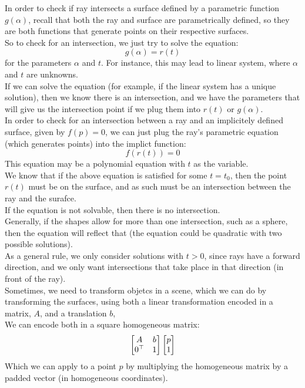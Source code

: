 \documentclass[12pt]{article}
\begin{document}
In order to check if ray intersects a
surface defined by a parametric function
$g(\alpha)$, recall that both the ray and
surface are parametrically defined, so
they are both functions that generate points
on their respective surfaces. \\
So to check for an intersection, we just try to
solve the equation:
\[ g(\alpha) = r(t) \]
for the parameters $\alpha$ and $t$.
For instance, this may lead to linear system,
where $\alpha$ and $t$ are unknowns. \\
If we can solve the equation (for example,
if the linear system has a unique solution),
then we know there is an intersection, and
we have the parameters that will give us the
intersection point if we plug them into
$r(t)$ or $g(\alpha)$. \\

In order to check for an intersection between
a ray and an implicitely defined surface,
given by $f(p) = 0$,
we can just plug the ray's parametric equation
(which generates points) into the implict function:
\[ f(r(t)) = 0 \]
This equation may be a polynomial equation with $t$
as the variable. \\
We know that if the above equation is satisfied
for some $t = t_0$, then the point $r(t)$
must be on the surface, and as such must be
an intersection between the ray and the surafce. \\
If the equation is not solvable, then there
is no intersection. \\
Generally, if the shapes allow for more than one
intersection, such as a sphere, then the equation
will reflect that (the equation could be
quadratic with two possible solutions). \\

As a general rule, we only consider solutions
with $t > 0$, since rays have a forward direction,
and we only want intersections that take place
in that direction (in front of the ray). \\

Sometimes, we need to transform objetcs in a
scene, which we can do by transforming the surfaces,
using both a linear transformation encoded in
a matrix, $A$, and a translation $b$, \\
We can encode both in a square homogeneous matrix:
\[ \begin{bmatrix} A & b \\ 0^\top & 1 \end{bmatrix} \begin{bmatrix} p \\ 1 \end{bmatrix} \]
Which we can apply to a point $p$ by multiplying
the homogeneous matrix by a padded vector
(in homogeneous coordinates). \\
\end{document}

